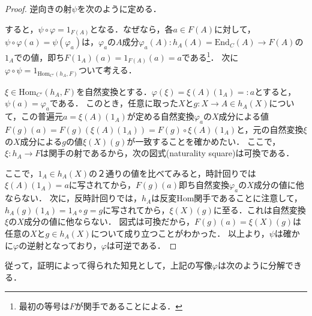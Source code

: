 \documentclass[uplatex, dvipdfmx]{jsreport}
\begin{document}
\begin{proof}
    逆向きの射$\psi$を次のように定める．
    \begin{center}\end{center}
    
    すると，$\psi\circ\varphi =1_{F(A)}$となる．なぜなら，各$a\in F(A)$に対して，$\psi\circ\varphi(a)=\psi(\varphi_a)$は，$\varphi_a$の$A$成分$\varphi_a(A):h_A(A)=\mathrm{End}_C(A)\to F(A)$の$1_A$での値，即ち$F(1_A)(a)=1_{F(A)}(a)=a$である\footnote{最初の等号は$F$が関手であることによる．}．
    次に$\varphi\circ\psi =1_{\mathrm{Hom}_{C'}(h_A,F)}$ついて考える．

    $\xi\in\mathrm{Hom}_{C'}(h_A,F)$を自然変換とする．$\varphi(\xi)=\xi(A)(1_A)=:a$とすると，$\psi(a)=\varphi_a$である．
    このとき，任意に取った$X$と$g:X\to A\in h_A(X)$について，この普遍元$a=\xi(A)(1_A)$が定める自然変換$\varphi_a$の$X$成分による値$F(g)(a)=F(g)(\xi(A)(1_A))=F(g)\circ \xi(A)(1_A)$と，元の自然変換$\xi$の$X$成分による$g$の値$\xi (X)(g)$が一致することを確かめたい．
    ここで，$\xi:h_A\to F$は関手の射であるから，次の図式(naturality square)は可換である．
    \begin{center}\end{center}
    ここで，$1_A\in h_A(X)$の２通りの値を比べてみると，時計回りでは$\xi(A)(1_A)=a$に写されてから，$F(g)(a)$即ち自然変換$\varphi_a$の$X$成分の値に他ならない．
    次に，反時計回りでは，$h_A$は反変Hom関手であることに注意して，\rm{}$h_A(g)(1_A)=1_A\circ g=g$に写されてから，$\xi(X)(g)$に至る．これは自然変換$\xi$の$X$成分の値に他ならない．
    図式は可換だから，$F(g)(a)=\xi (X)(g)$は任意の$X$と$g\in h_A(X)$について成り立つことがわかった．
    以上より，$\psi$は確かに$\varphi$の逆射となっており，$\varphi$は可逆である．
\end{proof}
従って，証明によって得られた知見として，上記の写像$\varphi$は次のように分解できる．
\begin{center}\end{center}
\end{document}
